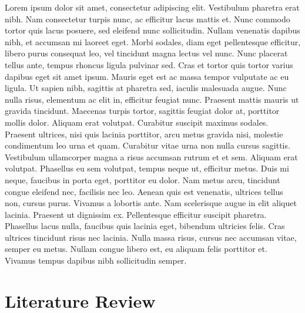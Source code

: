 \documentclass[a4paper]{memoir}
\begin{document}
Lorem ipsum dolor sit amet, consectetur adipiscing elit. Vestibulum pharetra erat nibh. Nam consectetur turpis nunc, ac efficitur lacus mattis et. Nunc commodo tortor quis lacus posuere, sed eleifend nunc sollicitudin. Nullam venenatis dapibus nibh, et accumsan mi laoreet eget. Morbi sodales, diam eget pellentesque efficitur, libero purus consequat leo, vel tincidunt magna lectus vel nunc. Nunc placerat tellus ante, tempus rhoncus ligula pulvinar sed. Cras et tortor quis tortor varius dapibus eget sit amet ipsum. Mauris eget est ac massa tempor vulputate ac eu ligula.
Ut sapien nibh, sagittis at pharetra sed, iaculis malesuada augue. Nunc nulla risus, elementum ac elit in, efficitur feugiat nunc. Praesent mattis mauris ut gravida tincidunt. Maecenas turpis tortor, sagittis feugiat dolor at, porttitor mollis dolor. Aliquam erat volutpat. Curabitur suscipit maximus sodales. Praesent ultrices, nisi quis lacinia porttitor, arcu metus gravida nisi, molestie condimentum leo urna et quam.
Curabitur vitae urna non nulla cursus sagittis. Vestibulum ullamcorper magna a risus accumsan rutrum et et sem. Aliquam erat volutpat. Phasellus eu sem volutpat, tempus neque ut, efficitur metus. Duis mi neque, faucibus in porta eget, porttitor eu dolor. Nam metus arcu, tincidunt congue eleifend nec, facilisis nec leo. Aenean quis est venenatis, ultrices tellus non, cursus purus. Vivamus a lobortis ante. Nam scelerisque augue in elit aliquet lacinia. Praesent ut dignissim ex. Pellentesque efficitur suscipit pharetra. Phasellus lacus nulla, faucibus quis lacinia eget, bibendum ultricies felis. Cras ultrices tincidunt risus nec lacinia. Nulla massa risus, cursus nec accumsan vitae, semper eu metus. Nullam congue libero est, eu aliquam felis porttitor et. Vivamus tempus dapibus nibh sollicitudin semper. 

\chapter*{Literature Review}
\label{literaturereview}
\end{document}
